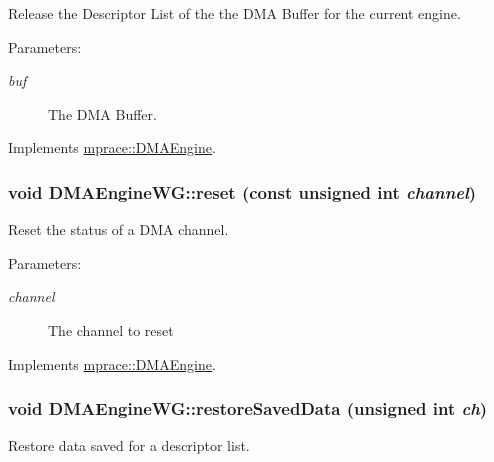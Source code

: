 Release the Descriptor List of the the DMA Buffer for the current engine. 

\begin{Desc}
\item[Parameters:]
\begin{description}
\item[{\em buf}]The DMA Buffer.\end{description}
\end{Desc}


Implements \hyperlink{classmprace_1_1DMAEngine_a6}{mprace::DMAEngine}.\hypertarget{classmprace_1_1DMAEngineWG_a3}{
\subsubsection[reset]{\setlength{\rightskip}{0pt plus 5cm}void DMAEngine\-WG::reset (const unsigned int {\em channel})}}
\label{classmprace_1_1DMAEngineWG_a3}


Reset the status of a DMA channel. 

\begin{Desc}
\item[Parameters:]
\begin{description}
\item[{\em channel}]The channel to reset\end{description}
\end{Desc}


Implements \hyperlink{classmprace_1_1DMAEngine_a2}{mprace::DMAEngine}.\hypertarget{classmprace_1_1DMAEngineWG_b6}{
\subsubsection[restoreSavedData]{\setlength{\rightskip}{0pt plus 5cm}void DMAEngine\-WG::restore\-Saved\-Data (unsigned int {\em ch})}}
\label{classmprace_1_1DMAEngineWG_b6}


Restore data saved for a descriptor list. 

